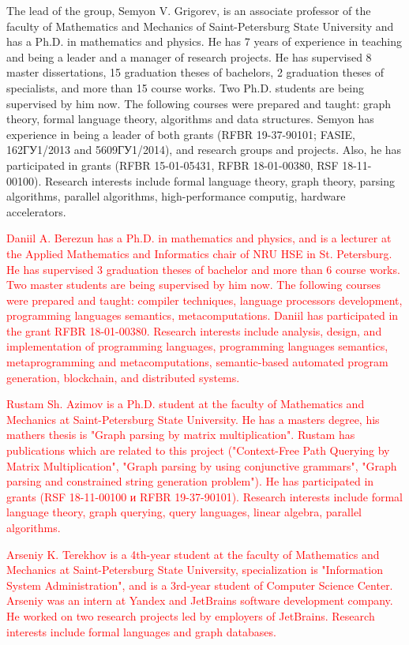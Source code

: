\documentclass[12pt]{article}  %
\theoremstyle{remark}
\newcommand{\checkme}[1]{\textcolor{red}{#1}}
\begin{document}
The lead of the group, Semyon V. Grigorev, is an associate professor of the faculty of Mathematics and Mechanics of Saint-Petersburg State University and has a Ph.D. in mathematics and physics. He has 7 years of experience in teaching and being a leader and a manager of research projects. He has supervised 8 master dissertations, 15 graduation theses of bachelors, 2 graduation theses of specialists, and more than 15 course works. Two Ph.D. students are being supervised by him now. The following courses were prepared and taught: graph theory, formal language theory, algorithms and data structures. Semyon has experience in being a leader of both grants  (RFBR 19-37-90101; FASIE, 162ГУ1/2013 and 5609ГУ1/2014), and research groups and projects. Also, he has participated in grants (RFBR 15-01-05431, RFBR 18-01-00380, RSF 18-11-00100). Research interests include formal language theory, graph theory, parsing algorithms, parallel algorithms, high-performance computig, hardware accelerators.

\checkme{Daniil A. Berezun has a Ph.D. in mathematics and physics, and is a lecturer at the Applied Mathematics and Informatics chair of NRU HSE in St. Petersburg. He has supervised 3 graduation theses of bachelor and more than 6 course works. Two master students are being supervised by him now. The following courses were prepared and taught: compiler techniques, language processors development, programming languages semantics, metacomputations. Daniil has participated in the grant RFBR 18-01-00380. Research interests include analysis, design, and implementation of programming languages, programming languages semantics, metaprogramming and metacomputations, semantic-based automated program generation, blockchain, and distributed systems.}

\checkme{Rustam Sh. Azimov is a Ph.D. student at the faculty of Mathematics and Mechanics at Saint-Petersburg State University. He has a masters degree, his mathers thesis is "Graph parsing by matrix multiplication". Rustam has publications which are related to this project ("Context-Free Path Querying by Matrix Multiplication", "Graph parsing by using conjunctive grammars", "Graph parsing and constrained string generation problem"). He has participated in grants (RSF 18-11-00100 и RFBR 19-37-90101). Research interests include formal language theory, graph querying, query languages, linear algebra, parallel algorithms.}

\checkme{Arseniy K. Terekhov is a 4th-year student at the faculty of Mathematics and Mechanics at Saint-Petersburg State University, specialization is "Information System Administration", and is a 3rd-year student of Computer Science Center. Arseniy was an intern at Yandex and JetBrains software development company. He worked on two research projects led by employers of JetBrains. Research interests include formal languages and graph databases.}
\end{document}
